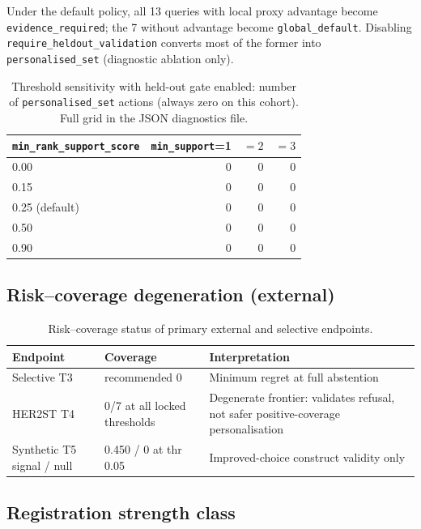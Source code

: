 \documentclass[11pt]{article}
\begin{document}
Under the default policy, all 13 queries with local proxy advantage become
\texttt{evidence\_required}; the 7 without advantage become
\texttt{global\_default}. Disabling \texttt{require\_heldout\_validation}
converts most of the former into \texttt{personalised\_set} (diagnostic
ablation only).

\begin{table}[ht]
\centering
\caption{Threshold sensitivity with held-out gate enabled: number of
\texttt{personalised\_set} actions (always zero on this cohort).
Full grid in the JSON diagnostics file.
\label{tab:si-thr}}
\begin{tabular}{@{}lrrr@{}}
\toprule
\texttt{min\_rank\_support\_score} & \texttt{min\_support}=1 & $=2$ & $=3$ \\
\midrule
0.00 & 0 & 0 & 0 \\
0.15 & 0 & 0 & 0 \\
0.25 (default) & 0 & 0 & 0 \\
0.50 & 0 & 0 & 0 \\
0.90 & 0 & 0 & 0 \\
\bottomrule
\end{tabular}
\end{table}

\subsection{Risk--coverage degeneration (external)}

\begin{table}[ht]
\centering
\caption{Risk--coverage status of primary external and selective endpoints.
\label{tab:si-riskcov}}
\begin{tabular}{@{}llp{}@{}}
\toprule
Endpoint & Coverage & Interpretation \\
\midrule
Selective T3 & recommended 0 & Minimum regret at full abstention \\
HER2ST T4 & 0/7 at all locked thresholds & Degenerate frontier: validates refusal,
not safer positive-coverage personalisation \\
Synthetic T5 signal / null & 0.450 / 0 at thr 0.05 & Improved-choice construct validity only \\
\bottomrule
\end{tabular}
\end{table}

\subsection{Registration strength class}
\end{document}
